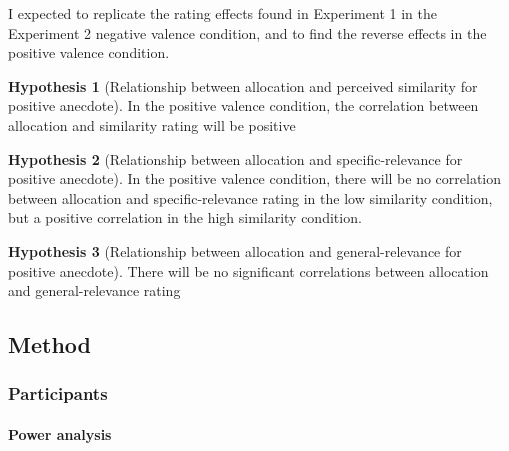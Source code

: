 \documentclass[a4paper, nobind, dvipsnames]{templates/ociamthesis}
\theoremstyle{definition}
\theoremstyle{definition}
\theoremstyle{definition}
\theoremstyle{definition}
\newtheorem{hypothesis}{Hypothesis}[chapter]
\theoremstyle{remark}
\begin{document}
I expected to replicate the rating effects found in Experiment 1 in the
Experiment 2 negative valence condition, and to find the reverse effects in the
positive valence condition.

\begin{hypothesis}[Relationship between allocation and perceived similarity for positive anecdote]
\protect\hypertarget{hyp:allocation-similarity-anecdotes-2}{}{\label{hyp:allocation-similarity-anecdotes-2} {} }In the positive valence condition, the correlation between allocation and
similarity rating will be positive
\end{hypothesis}

\begin{hypothesis}[Relationship between allocation and specific-relevance for positive anecdote]
\protect\hypertarget{hyp:allocation-specific-relevance-anecdotes-2}{}{\label{hyp:allocation-specific-relevance-anecdotes-2} {} }In the positive valence condition, there will be no correlation between
allocation and specific-relevance rating in the low similarity condition, but a
positive correlation in the high similarity condition.
\end{hypothesis}

\begin{hypothesis}[Relationship between allocation and general-relevance for positive anecdote]
\protect\hypertarget{hyp:allocation-general-relevance-anecdotes-2}{}{\label{hyp:allocation-general-relevance-anecdotes-2} {} }There will be no significant correlations between allocation and
general-relevance rating
\end{hypothesis}

\hypertarget{method-18}{%
\subsection{Method}\label{method-18}}

\hypertarget{participants-16}{%
\subsubsection{Participants}\label{participants-16}}

\hypertarget{power-analysis-anecdotes-2}{%
\paragraph{Power analysis}\label{power-analysis-anecdotes-2}}
\end{document}
